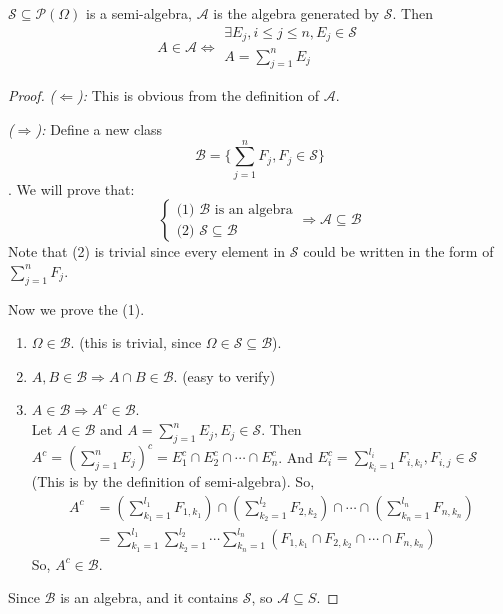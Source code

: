\begin{lemma}
  $\mathcal{S}\subseteq\mathcal{P}(\Omega)$ is a semi-algebra, $\mathcal{A}$ is the algebra generated by $\mathcal{S}$. Then
  \[A\in\mathcal{A} \Leftrightarrow \substack{\exists E_j, i\leq j\leq n, E_j \in \mathcal{S}\\A=\sum_{j=1}^n E_j}\]
\end{lemma}
\begin{proof}
  \emph{($\Leftarrow$):} This is obvious from the definition of $\mathcal{A}$.

  \emph{($\Rightarrow$):} Define a new class
  \[\mathcal{B} = \{\sum_{j=1}^n F_j, F_j\in\mathcal{S}\}\].
  We will prove that: \[
    \left\{
      \begin{array}{l}
        \mbox{(1) $\mathcal{B}$ is an algebra} \\
        \mbox{(2) }\mathcal{S} \subseteq \mathcal{B}
      \end{array}
    \right. \Rightarrow \mathcal{A} \subseteq \mathcal{B}
  \]
  Note that (2) is trivial since every element in $\mathcal{S}$ could be written in the form of $\sum_{j=1}^n F_j$.
  
  Now we prove the (1).
  \begin{enumerate}
  \item $\Omega\in\mathcal{B}$. (this is trivial, since $\Omega\in\mathcal{S}\subseteq\mathcal{B}$).
  \item $A,B\in\mathcal{B}\Rightarrow A\cap B\in\mathcal{B}$. (easy to verify)
  \item $A\in\mathcal{B}\Rightarrow A^c\in\mathcal{B}$. \\
    Let $A\in\mathcal{B}$ and $A = \sum_{j=1}^n E_j, E_j\in\mathcal{S}$.
    Then $A^c = (\sum_{j=1}^n E_j)^c = E_1^c \cap E_2^c \cap \cdots \cap E_n^c$.
    And $E_i^c = \sum_{k_i = 1}^{l_i} F_{i, k_i}, F_{i, j} \in \mathcal{S}$ (This is by the definition of semi-algebra).
    So,
    \begin{align*}
    A^c &= (\sum_{k_1=1}^{l_1}F_{1,k_1})\cap(\sum_{k_2=1}^{l_2}F_{2,k_2})\cap\cdots\cap(\sum_{k_n=1}^{l_n}F_{n,k_n}) \\
    &= \sum_{k_1=1}^{l_1}\sum_{k_2=1}^{l_2}\cdots\sum_{k_n=1}^{l_n} (F_{1,k_1}\cap F_{2,k_2}\cap\cdots\cap F_{n,k_n})
    \end{align*}
    So, $A^c\in\mathcal{B}$.
  \end{enumerate}
  Since $\mathcal{B}$ is an algebra, and it contains $\mathcal{S}$, so $\mathcal{A}\subseteq{S}$.
\end{proof}

